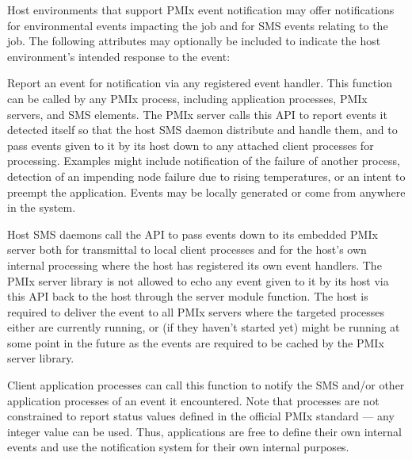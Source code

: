 
\reqattrend

\optattrstart
Host environments that support \ac{PMIx} event notification may offer notifications for environmental events impacting the job and for \ac{SMS} events relating to the job. The following attributes may optionally be included to indicate the host environment's intended response to the event:


\optattrend

\descr

Report an event for notification via any registered event handler. This function can be called by any \ac{PMIx} process, including application processes, \ac{PMIx} servers, and \ac{SMS} elements. The \ac{PMIx} server calls this \ac{API} to report events it detected itself so that the host \ac{SMS} daemon distribute and handle them, and to pass events given to it by its host down to any attached client processes for processing. Examples might include notification of the failure of another process, detection of an impending node failure due to rising temperatures, or an intent to preempt the application. Events may be locally generated or come from anywhere in the system.

Host \ac{SMS} daemons call the \ac{API} to pass events down to its embedded \ac{PMIx} server both for transmittal to local client processes and for the host's own internal processing where the host has registered its own event handlers. The \ac{PMIx} server library is not allowed to echo any event given to it by its host via this \ac{API} back to the host through the  server module function. The host is required to deliver the event to all \ac{PMIx} servers where the targeted processes either are currently running, or (if they haven't started yet) might be running at some point in the future as the events are required to be cached by the \ac{PMIx} server library.

Client application processes can call this function to notify the \ac{SMS} and/or other application processes of an event it encountered. Note that processes are not constrained to report status values defined in the official \ac{PMIx} standard --- any integer value can be used. Thus, applications are free to define their own internal events and use the notification system for their own internal purposes.

